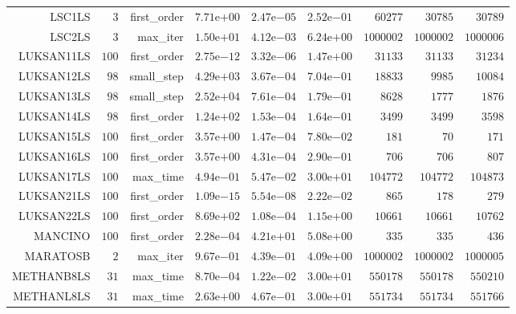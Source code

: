 \begin{longtable}{rrrrrrrrr}
LSC1LS & \(     3\) & first\_order & \( 7.71\)e\(+00\) & \( 2.47\)e\(-05\) & \( 2.52\)e\(-01\) & \( 60277\) & \( 30785\) & \( 30789\) \\
LSC2LS & \(     3\) & max\_iter & \( 1.50\)e\(+01\) & \( 4.12\)e\(-03\) & \( 6.24\)e\(+00\) & \(1000002\) & \(1000002\) & \(1000006\) \\
LUKSAN11LS & \(   100\) & first\_order & \( 2.75\)e\(-12\) & \( 3.32\)e\(-06\) & \( 1.47\)e\(+00\) & \( 31133\) & \( 31133\) & \( 31234\) \\
LUKSAN12LS & \(    98\) & small\_step & \( 4.29\)e\(+03\) & \( 3.67\)e\(-04\) & \( 7.04\)e\(-01\) & \( 18833\) & \(  9985\) & \( 10084\) \\
LUKSAN13LS & \(    98\) & small\_step & \( 2.52\)e\(+04\) & \( 7.61\)e\(-04\) & \( 1.79\)e\(-01\) & \(  8628\) & \(  1777\) & \(  1876\) \\
LUKSAN14LS & \(    98\) & first\_order & \( 1.24\)e\(+02\) & \( 1.53\)e\(-04\) & \( 1.64\)e\(-01\) & \(  3499\) & \(  3499\) & \(  3598\) \\
LUKSAN15LS & \(   100\) & first\_order & \( 3.57\)e\(+00\) & \( 1.47\)e\(-04\) & \( 7.80\)e\(-02\) & \(   181\) & \(    70\) & \(   171\) \\
LUKSAN16LS & \(   100\) & first\_order & \( 3.57\)e\(+00\) & \( 4.31\)e\(-04\) & \( 2.90\)e\(-01\) & \(   706\) & \(   706\) & \(   807\) \\
LUKSAN17LS & \(   100\) & max\_time & \( 4.94\)e\(-01\) & \( 5.47\)e\(-02\) & \( 3.00\)e\(+01\) & \(104772\) & \(104772\) & \(104873\) \\
LUKSAN21LS & \(   100\) & first\_order & \( 1.09\)e\(-15\) & \( 5.54\)e\(-08\) & \( 2.22\)e\(-02\) & \(   865\) & \(   178\) & \(   279\) \\
LUKSAN22LS & \(   100\) & first\_order & \( 8.69\)e\(+02\) & \( 1.08\)e\(-04\) & \( 1.15\)e\(+00\) & \( 10661\) & \( 10661\) & \( 10762\) \\
MANCINO & \(   100\) & first\_order & \( 2.28\)e\(-04\) & \( 4.21\)e\(+01\) & \( 5.08\)e\(+00\) & \(   335\) & \(   335\) & \(   436\) \\
MARATOSB & \(     2\) & max\_iter & \( 9.67\)e\(-01\) & \( 4.39\)e\(-01\) & \( 4.09\)e\(+00\) & \(1000002\) & \(1000002\) & \(1000005\) \\
METHANB8LS & \(    31\) & max\_time & \( 8.70\)e\(-04\) & \( 1.22\)e\(-02\) & \( 3.00\)e\(+01\) & \(550178\) & \(550178\) & \(550210\) \\
METHANL8LS & \(    31\) & max\_time & \( 2.63\)e\(+00\) & \( 4.67\)e\(-01\) & \( 3.00\)e\(+01\) & \(551734\) & \(551734\) & \(551766\) \\

\end{longtable}
